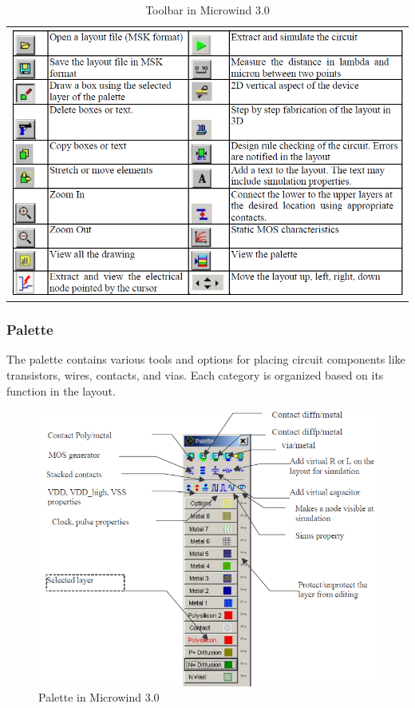 \documentclass[a4paper,12pt]{article}
\begin{document}
	\begin{table}[h]
		\caption{Toolbar in Microwind 3.0}
		\centering
		
		\begin{tabular}{c}
			
			\includegraphics[width=1\linewidth]{Images/microwind/toolbar3} 
			
		\end{tabular}
		
		\label{tab:toolbar}
	\end{table}
	
	\newpage
	
	\subsubsection{Palette}
	The palette contains various tools and options for placing circuit components like transistors, wires, contacts, and vias. Each category is organized based on its function in the layout.
	\begin{figure}[H]
		\centering
		\includegraphics[width=1\linewidth]{Images/microwind/palette}
		\caption{Palette in Microwind 3.0}
		\label{fig:palette}
	\end{figure}
	
\end{document}
